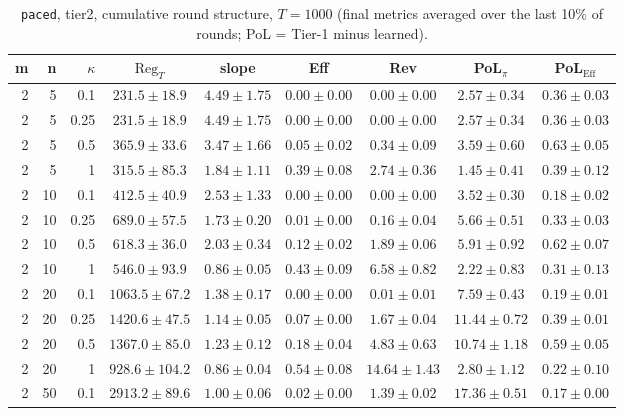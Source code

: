 \begin{table}[htbp]
\centering
\scriptsize
\caption{\texttt{paced}, tier2, cumulative round structure, $T=1000$ (final metrics averaged over the last 10\% of rounds; PoL = Tier-1 minus learned).}
\label{tab:tier2_paced_cumulative}
\begin{tabular}{@{}rrrcccccc@{}}
\toprule
m & n & $\kappa$ & $\mathrm{Reg}_T$ & slope & Eff & Rev & PoL$_\pi$ & PoL$_\mathrm{Eff}$ \\
\midrule
2 & 5 & 0.1 & $231.5 \pm 18.9$ & $4.49 \pm 1.75$ & $0.00 \pm 0.00$ & $0.00 \pm 0.00$ & $2.57 \pm 0.34$ & $0.36 \pm 0.03$ \\
2 & 5 & 0.25 & $231.5 \pm 18.9$ & $4.49 \pm 1.75$ & $0.00 \pm 0.00$ & $0.00 \pm 0.00$ & $2.57 \pm 0.34$ & $0.36 \pm 0.03$ \\
2 & 5 & 0.5 & $365.9 \pm 33.6$ & $3.47 \pm 1.66$ & $0.05 \pm 0.02$ & $0.34 \pm 0.09$ & $3.59 \pm 0.60$ & $0.63 \pm 0.05$ \\
2 & 5 & 1 & $315.5 \pm 85.3$ & $1.84 \pm 1.11$ & $0.39 \pm 0.08$ & $2.74 \pm 0.36$ & $1.45 \pm 0.41$ & $0.39 \pm 0.12$ \\
2 & 10 & 0.1 & $412.5 \pm 40.9$ & $2.53 \pm 1.33$ & $0.00 \pm 0.00$ & $0.00 \pm 0.00$ & $3.52 \pm 0.30$ & $0.18 \pm 0.02$ \\
2 & 10 & 0.25 & $689.0 \pm 57.5$ & $1.73 \pm 0.20$ & $0.01 \pm 0.00$ & $0.16 \pm 0.04$ & $5.66 \pm 0.51$ & $0.33 \pm 0.03$ \\
2 & 10 & 0.5 & $618.3 \pm 36.0$ & $2.03 \pm 0.34$ & $0.12 \pm 0.02$ & $1.89 \pm 0.06$ & $5.91 \pm 0.92$ & $0.62 \pm 0.07$ \\
2 & 10 & 1 & $546.0 \pm 93.9$ & $0.86 \pm 0.05$ & $0.43 \pm 0.09$ & $6.58 \pm 0.82$ & $2.22 \pm 0.83$ & $0.31 \pm 0.13$ \\
2 & 20 & 0.1 & $1063.5 \pm 67.2$ & $1.38 \pm 0.17$ & $0.00 \pm 0.00$ & $0.01 \pm 0.01$ & $7.59 \pm 0.43$ & $0.19 \pm 0.01$ \\
2 & 20 & 0.25 & $1420.6 \pm 47.5$ & $1.14 \pm 0.05$ & $0.07 \pm 0.00$ & $1.67 \pm 0.04$ & $11.44 \pm 0.72$ & $0.39 \pm 0.01$ \\
2 & 20 & 0.5 & $1367.0 \pm 85.0$ & $1.23 \pm 0.12$ & $0.18 \pm 0.04$ & $4.83 \pm 0.63$ & $10.74 \pm 1.18$ & $0.59 \pm 0.05$ \\
2 & 20 & 1 & $928.6 \pm 104.2$ & $0.86 \pm 0.04$ & $0.54 \pm 0.08$ & $14.64 \pm 1.43$ & $2.80 \pm 1.12$ & $0.22 \pm 0.10$ \\
2 & 50 & 0.1 & $2913.2 \pm 89.6$ & $1.00 \pm 0.06$ & $0.02 \pm 0.00$ & $1.39 \pm 0.02$ & $17.36 \pm 0.51$ & $0.17 \pm 0.00$ \\

\end{tabular}
\end{table}
